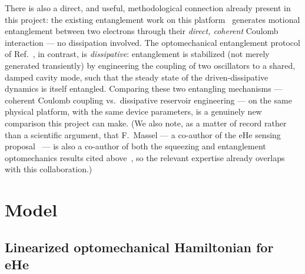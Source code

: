 \documentclass[aps,prapplied,reprint,superscriptaddress,longbibliography]{revtex4-2}
\begin{document}
There is also a direct, and useful, methodological connection already present in this project: the
existing entanglement work on this platform~\cite{beysengulov2024} generates motional entanglement
between two electrons through their \emph{direct, coherent} Coulomb interaction — no dissipation
involved. The optomechanical entanglement protocol of Ref.~\cite{ockeloenkorppi2018stabilized}, in
contrast, is \emph{dissipative}: entanglement is stabilized (not merely generated transiently) by
engineering the coupling of two oscillators to a shared, damped cavity mode, such that the steady
state of the driven-dissipative dynamics is itself entangled. Comparing these two entangling
mechanisms — coherent Coulomb coupling vs.\ dissipative reservoir engineering — on the same physical
platform, with the same device parameters, is a genuinely new comparison this project can make.
(We also note, as a matter of record rather than a scientific argument, that F.~Massel — a co-author
of the eHe sensing proposal~\cite{perruzza2026} — is also a co-author of both the squeezing and
entanglement optomechanics results cited above~\cite{pirkkalainen2015squeezing,ockeloenkorppi2018stabilized},
so the relevant expertise already overlaps with this collaboration.)

\section{Model}

\subsection{Linearized optomechanical Hamiltonian for eHe}
\end{document}
